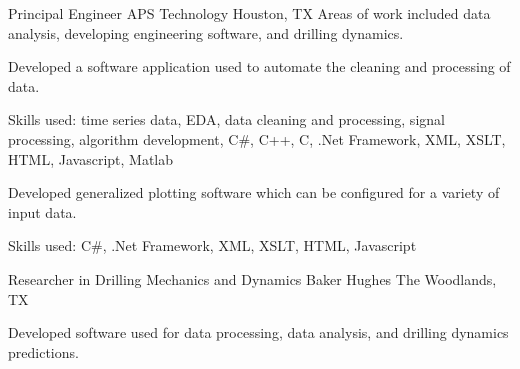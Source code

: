 \documentclass{leresume}
\begin{document}
            {Principal Engineer}
            {APS Technology}
			{Houston, TX}
			Areas of work included data analysis, developing engineering software, and drilling dynamics.\nolinebreak[4]
		\begin{bulletedlist}
			
		\item
		
					Developed a software application used to automate the cleaning and processing of data.
				
		\begin{bulletedlist}
			
		\item
		
						Skills used: time series data, EDA, data cleaning and processing, signal processing, algorithm development, C\#, C++, C, .Net Framework, XML, XSLT, HTML, Javascript, Matlab
					
		\end{bulletedlist}
	
		\item
		
					Developed generalized plotting software which can be configured for a variety of input data.
				
		\begin{bulletedlist}
			
		\item
		
						Skills used: C\#, .Net Framework, XML, XSLT, HTML, Javascript
					
		\end{bulletedlist}
	
		\end{bulletedlist}
	
            {Researcher in Drilling Mechanics and Dynamics}
            {Baker Hughes}
			{The Woodlands, TX}
			
				Developed software used for data processing, data analysis, and drilling dynamics predictions.
			
\end{document}
